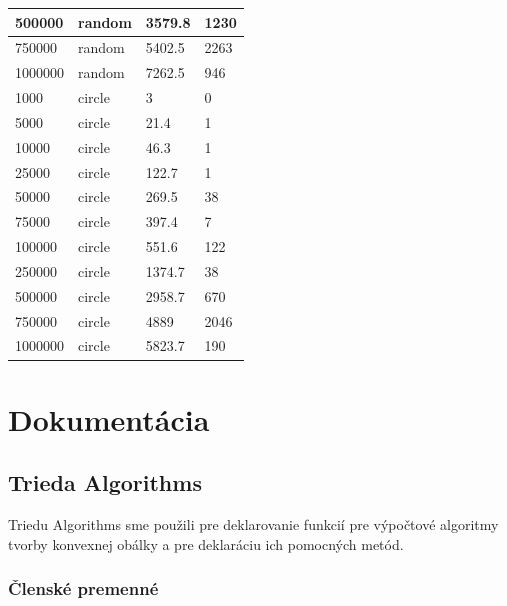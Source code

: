 \documentclass[12pt]{article}
\begin{document}
\begin{table}[h!]
\begin{tabular}{|l|l|l|l|}
500000  & random & 3579.8                    & 1230              \\ \hline
750000  & random & 5402.5                    & 2263              \\ \hline
1000000 & random & 7262.5                    & 946               \\ \hline
1000    & circle & 3                         & 0                 \\ \hline
5000    & circle & 21.4                      & 1                 \\ \hline
10000   & circle & 46.3                      & 1                 \\ \hline
25000   & circle & 122.7                     & 1                 \\ \hline
50000   & circle & 269.5                     & 38                \\ \hline
75000   & circle & 397.4                     & 7                 \\ \hline
100000  & circle & 551.6                     & 122               \\ \hline
250000  & circle & 1374.7                    & 38                \\ \hline
500000  & circle & 2958.7                    & 670               \\ \hline
750000  & circle & 4889                      & 2046              \\ \hline
1000000 & circle & 5823.7                    & 190               \\ \hline
\end{tabular}
\label{tab:GrahamScan}
\end{table}

\clearpage
\section{Dokumentácia}
\subsection{Trieda Algorithms}
Triedu Algorithms sme použili pre deklarovanie funkcií pre výpočtové algoritmy tvorby konvexnej obálky a pre deklaráciu ich pomocných metód.

\subsubsection{Členské premenné}
\end{document}
